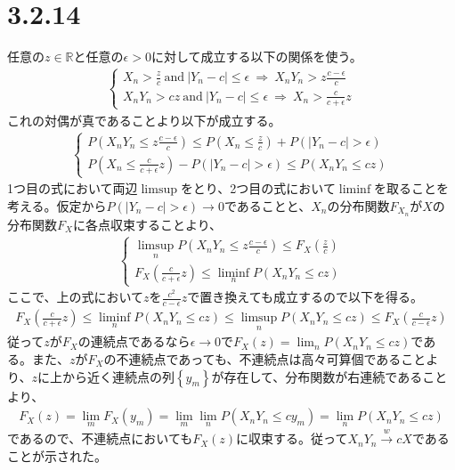 \documentclass{article}
\begin{document}
\section{3.2.14}
任意の$z \in \mathbb{R}$と任意の$\epsilon > 0$に対して成立する以下の関係を使う。
\begin{align*}
	\begin{cases}
	X_n > \frac{z}{c}\ \text{and}\ |Y_n - c| \leq \epsilon\ \Rightarrow\ X_n Y_n > z\frac{c-\epsilon}{c}\\[8pt]
	X_n Y_n > cz\ \text{and}\ |Y_n - c| \leq \epsilon\ \Rightarrow\ X_n > \frac{c}{c+\epsilon}z
	\end{cases}
\end{align*}
これの対偶が真であることより以下が成立する。
\begin{align*}
	\begin{cases}
	P\left( X_n Y_n \leq z\frac{c-\epsilon}{c} \right) \leq P\left( X_n \leq \frac{z}{c} \right) + P\left(  |Y_n - c| > \epsilon \right)\\[8pt]
	P\left( X_n \leq \frac{c}{c+\epsilon}z \right) - P\left( |Y_n - c| > \epsilon \right)  \leq P\left( X_n Y_n \leq cz \right)
	\end{cases}
\end{align*}
1つ目の式において両辺$\limsup$をとり、2つ目の式において$\liminf$を取ることを考える。仮定から$P\left( |Y_n - c| > \epsilon \right) \to 0$であることと、$X_n$の分布関数$F_{X_n}$が$X$の分布関数$F_X$に各点収束することより、
\begin{align*}
	\begin{cases}
	\limsup_n P\left( X_n Y_n \leq z\frac{c-\epsilon}{c} \right) \leq F_X\left( \frac{z}{c} \right)\\[8pt]
	F_X\left( \frac{c}{c+\epsilon}z \right) \leq \liminf_n P\left( X_n Y_n \leq cz \right)
	\end{cases}
\end{align*}
ここで、上の式において$z$を$\frac{c^2}{c-\epsilon}z$で置き換えても成立するので以下を得る。
\begin{align*}
	F_X\left( \frac{c}{c+\epsilon} z \right) \leq \liminf_n P\left( X_n Y_n \leq cz \right) \leq \limsup_n P\left( X_n Y_n \leq cz \right) \leq F_X\left( \frac{c}{c-\epsilon} z \right)
\end{align*}
従って$z$が$F_X$の連続点であるなら$\epsilon \to 0$で$F_X(z) = \lim_n P\left( X_n Y_n \leq cz \right)$である。また、$z$が$F_X$の不連続点であっても、不連続点は高々可算個であることより、$z$に上から近く連続点の列$\left\{ y_m \right\}$が存在して、分布関数が右連続であることより、
\begin{align*}
	F_X(z) = \lim_m F_X(y_m) = \lim_m \lim_n P\left( X_n Y_n \leq cy_m \right) = \lim_n P\left( X_n Y_n \leq cz \right)
\end{align*}
であるので、不連続点においても$F_X(z)$に収束する。従って$X_n Y_n \xrightarrow{w} cX$であることが示された。
\end{document}
